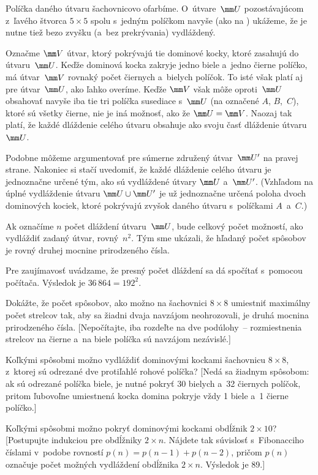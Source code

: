 {%
Políčka daného útvaru šachovnicovo ofarbíme. O~útvare~$\mm U$ pozostávajúcom
z~ľavého štvorca $5\times 5$ spolu s~jedným políčkom navyše (ako na
\obr) ukážeme, že je nutne tiež bezo zvyšku (a~bez prekrývania)
vydláždený.
%

Označme $\mm V$ útvar, ktorý pokrývajú tie dominové kocky, ktoré zasahujú do
útvaru~$\mm U$. Keďže dominová kocka zakryje jedno biele a~jedno čierne
políčko, má útvar~$\mm V$ rovnaký počet čiernych a~bielych políčok. To isté však
platí aj pre útvar~$\mm U$, ako ľahko overíme.
Keďže $\mm V$ však môže oproti~$\mm U$ obsahovať navyše iba tie tri políčka susediace
s~$\mm U$ (na  označené $A$, $B$,~$C$), ktoré sú všetky čierne, nie je iná
možnosť, ako že $\mm U=\mm V$.
Naozaj tak platí, že každé dláždenie celého útvaru obsahuje ako svoju
časť dláždenie útvaru~$\mm U$.

Podobne môžeme argumentovať pre súmerne združený útvar~$\mm U'$ na pravej strane.
Nakoniec si stačí uvedomiť, že každé dláždenie celého útvaru je
jednoznačne určené tým, ako sú vydláždené útvary $\mm U$ a~$\mm U'$.
(Vzhľadom na úplné vydláždenie útvaru $\mm U\cup\mm U'$ je už jednoznačne určená
poloha dvoch dominových kociek, ktoré pokrývajú zvyšok daného útvaru s~políčkami $A$~a~$C$.)

Ak označíme $n$ počet dláždení útvaru~$\mm U$, bude celkový počet možností,
ako vydláždiť zadaný útvar, rovný~$n^2$.
Tým sme ukázali, že hľadaný počet spôsobov je rovný druhej mocnine
prirodzeného čísla.

\poznamka
Pre zaujímavosť uvádzame, že presný počet dláždení sa dá
spočítať s~pomocou počítača. Výsledok je $36\,864 = 192^2$.



Dokážte, že počet spôsobov, ako možno na šachovnici $8\times 8$
umiestniť maximálny počet strelcov tak, aby sa žiadni dvaja navzájom
neohrozovali, je druhá mocnina prirodzeného čísla. [Nepočítajte,
iba rozdeľte na dve podúlohy~-- rozmiestnenia strelcov na čierne
a~na biele políčka sú navzájom nezávislé.]

Koľkými spôsobmi možno vydláždiť dominovými kockami šachovnicu
$8\times 8$, z~ktorej sú odrezané dve protiľahlé rohové políčka?
[Nedá sa žiadnym spôsobom: ak sú odrezané políčka biele, je nutné pokryť 30
bielych a~32 čiernych políčok, pritom ľubovoľne umiestnená kocka domina
pokryje vždy 1 biele a~1 čierne políčko.]

\D
Koľkými spôsobmi možno pokryť dominovými kockami obdĺžnik
$2\times 10$? [Postupujte indukciou pre obdĺžniky $2\times n$. Nájdete tak súvislosť
s~Fibonacciho číslami v~podobe rovností $p(n)=p(n-1)+p(n-2)$, pričom $p(n)$
označuje počet možných vydláždení obdĺžnika $2\times n$. Výsledok je 89.]

}
